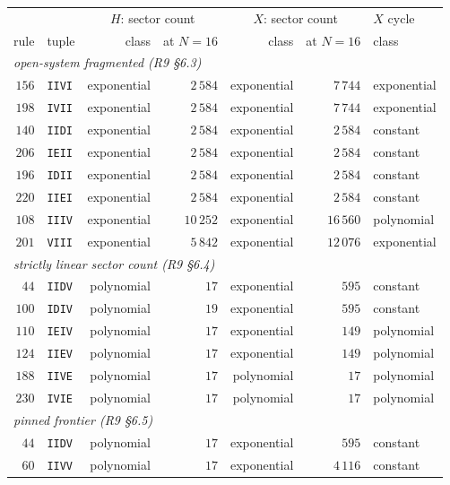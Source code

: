 \begin{tabular}{rlrrrrl}
\hline
 & & \multicolumn{2}{c}{$H$: sector count} & \multicolumn{2}{c}{$X$: sector count} & $X$ cycle \\
rule & tuple & class & at $N=16$ & class & at $N=16$ & class \\
\hline
\multicolumn{7}{l}{\emph{open-system fragmented (R9 \S6.3)}} \\
\quad $156$ & \texttt{IIVI} & exponential & $2\,584$ & exponential & $7\,744$ & exponential \\
\quad $198$ & \texttt{IVII} & exponential & $2\,584$ & exponential & $7\,744$ & exponential \\
\quad $140$ & \texttt{IIDI} & exponential & $2\,584$ & exponential & $2\,584$ & constant \\
\quad $206$ & \texttt{IEII} & exponential & $2\,584$ & exponential & $2\,584$ & constant \\
\quad $196$ & \texttt{IDII} & exponential & $2\,584$ & exponential & $2\,584$ & constant \\
\quad $220$ & \texttt{IIEI} & exponential & $2\,584$ & exponential & $2\,584$ & constant \\
\quad $108$ & \texttt{IIIV} & exponential & $10\,252$ & exponential & $16\,560$ & polynomial \\
\quad $201$ & \texttt{VIII} & exponential & $5\,842$ & exponential & $12\,076$ & exponential \\
\multicolumn{7}{l}{\emph{strictly linear sector count (R9 \S6.4)}} \\
\quad $44$ & \texttt{IIDV} & polynomial & $17$ & exponential & $595$ & constant \\
\quad $100$ & \texttt{IDIV} & polynomial & $19$ & exponential & $595$ & constant \\
\quad $110$ & \texttt{IEIV} & polynomial & $17$ & exponential & $149$ & polynomial \\
\quad $124$ & \texttt{IIEV} & polynomial & $17$ & exponential & $149$ & polynomial \\
\quad $188$ & \texttt{IIVE} & polynomial & $17$ & polynomial & $17$ & polynomial \\
\quad $230$ & \texttt{IVIE} & polynomial & $17$ & polynomial & $17$ & polynomial \\
\multicolumn{7}{l}{\emph{pinned frontier (R9 \S6.5)}} \\
\quad $44$ & \texttt{IIDV} & polynomial & $17$ & exponential & $595$ & constant \\
\quad $60$ & \texttt{IIVV} & polynomial & $17$ & exponential & $4\,116$ & constant \\

\end{tabular}
